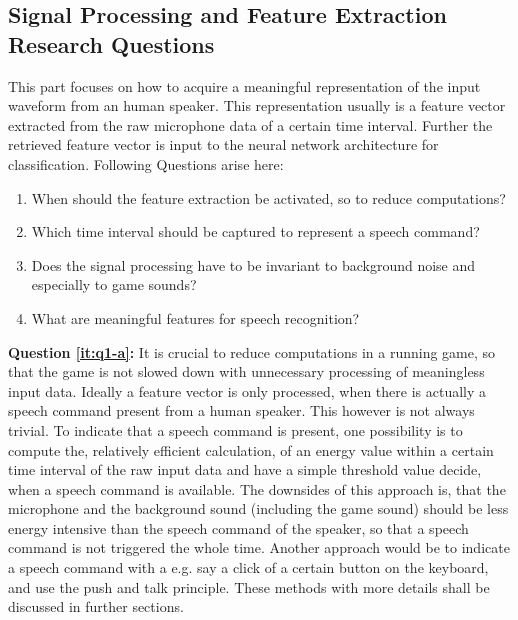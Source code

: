 \subsection{Signal Processing and Feature Extraction Research Questions}
This part focuses on how to acquire a meaningful representation of the input waveform from an human speaker. This representation usually is a feature vector extracted from the raw microphone data of a certain time interval. Further the retrieved feature vector is input to the neural network architecture for classification. Following Questions arise here:

\begin{enumerate}[label={Q.1.\alph*)}, leftmargin=1.75cm]
    \item When should the feature extraction be activated, so to reduce computations?
    
    \label{it:q1-a}
    
    \item Which time interval should be captured to represent a speech command?
    \label{it:q1-b}
    
    \item Does the signal processing have to be invariant to background noise and especially to game sounds?
    \label{it:q1-c}
    
    \item What are meaningful features for speech recognition?
    \label{it:q1-d}
    
\end{enumerate}
\noindent
\textbf{Question \ref{it:q1-a}:} 
It is crucial to reduce computations in a running game, so that the game is not slowed down with unnecessary processing of meaningless input data.
Ideally a feature vector is only processed, when there is actually a speech command present from a human speaker. 
This however is not always trivial.
To indicate that a speech command is present, one possibility is to compute the, relatively efficient calculation, of an energy value within a certain time interval of the raw input data and have a simple threshold value decide, when a speech command is available. 
The downsides of this approach is, that the microphone and the background sound (including the game sound) should be less energy intensive than the speech command of the speaker, so that a speech command is not triggered the whole time.
Another approach would be to indicate a speech command with a e.g. say a click of a certain button on the keyboard, and use the push and talk principle. 
These methods with more details shall be discussed in further sections.

